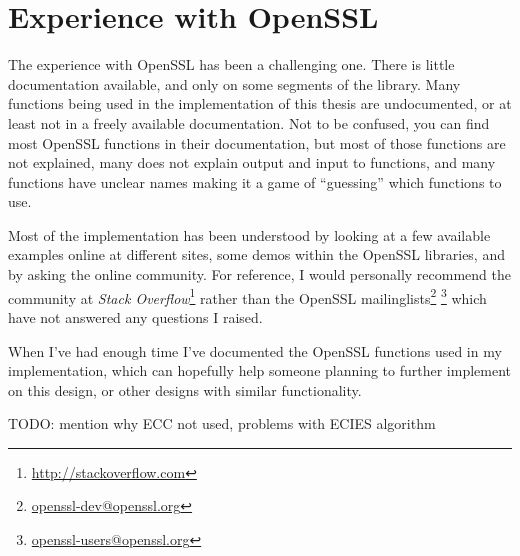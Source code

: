 \section{Experience with OpenSSL}
The experience with OpenSSL has been a challenging one. There is little
documentation available, and only on some segments of the library. Many
functions being used in the implementation of this thesis are undocumented, or
at least not in a freely available documentation. Not to be confused, you can
find most OpenSSL functions in their documentation, but most of those functions
are not explained, many does not explain output and input to functions, and many
functions have unclear names making it a game of ``guessing'' which functions to
use.

Most of the implementation has been understood by looking at a few available
examples online at different sites, some demos within the OpenSSL libraries,
and by asking the online community. For reference, I would personally recommend the
community at \emph{Stack Overflow}\footnote{\url{http://stackoverflow.com}}
rather than the OpenSSL mailinglists\footnote{\url{openssl-dev@openssl.org}}
\footnote{\url{openssl-users@openssl.org}} which have not answered any
questions I raised.

When I've had enough time I've documented the OpenSSL functions used in my
implementation, which can hopefully help someone planning to further implement
on this design, or other designs with similar functionality.

TODO: mention why ECC not used, problems with ECIES algorithm